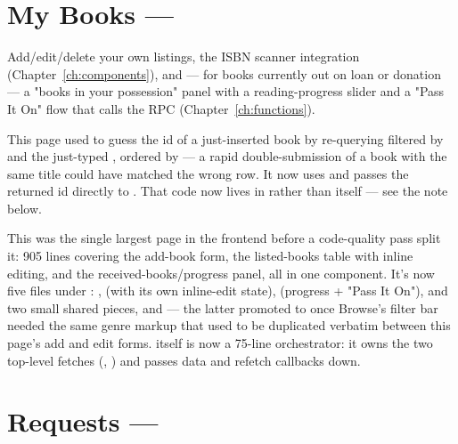 \section{My Books — }

Add/edit/delete your own listings, the ISBN scanner integration (Chapter~\ref{ch:components}), and — for books currently out on loan or donation — a "books in your possession" panel with a reading-progress slider and a "Pass It On" flow that calls the  RPC (Chapter~\ref{ch:functions}).

\begin{olknote}
This page used to guess the id of a just-inserted book by re-querying  filtered by  and the just-typed , ordered by  — a rapid double-submission of a book with the same title could have matched the wrong row. It now uses  and passes the returned id directly to . That code now lives in  rather than  itself — see the note below.
\end{olknote}

\begin{olknote}
This was the single largest page in the frontend before a code-quality pass split it: 905 lines covering the add-book form, the listed-books table with inline editing, and the received-books/progress panel, all in one component. It's now five files under : ,  (with its own inline-edit state),  (progress + "Pass It On"), and two small shared pieces,  and  — the latter promoted to  once Browse's filter bar needed the same genre  markup that used to be duplicated verbatim between this page's add and edit forms.  itself is now a 75-line orchestrator: it owns the two top-level fetches (, ) and passes data and refetch callbacks down.
\end{olknote}

\section{Requests — }
\label{sec:requests-page}

